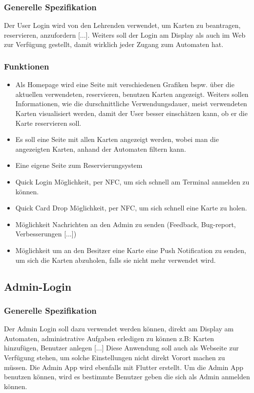 \documentclass[a4paper]{article}
\begin{document}
\subsubsection{Generelle Spezifikation}
Der User Login wird von den Lehrenden verwendet, um Karten zu beantragen, reservieren, anzufordern [...]. Weiters soll der Login am Display als auch im Web zur Verfügung gestellt, damit wirklich jeder Zugang zum Automaten hat. 

\subsubsection{Funktionen}
\begin{itemize}
  \item Als Homepage wird eine Seite mit verschiedenen Grafiken  bspw. über die aktuellen verwendeten, reservieren, benutzen Karten angezeigt. Weiters sollen Informationen, wie die durschnittliche Verwendungsdauer, meist verwendeten Karten visualisiert werden, damit der User besser einschätzen kann, ob er die Karte reservieren soll.
  \item Es soll eine Seite mit allen Karten angezeigt werden, wobei man die angezeigten Karten, anhand der Automaten filtern kann.
  \item Eine eigene Seite zum Reservierungsystem
  \item Quick Login Möglichkeit, per NFC, um sich schnell am Terminal anmelden zu können. 
  \item Quick Card Drop Möglichkeit, per NFC, um sich schnell eine Karte zu holen.
  \item Möglichkeit Nachrichten an den Admin zu senden (Feedback, Bug-report, Verbesserungen [...])
  \item Möglichkeit um an den Besitzer eine Karte eine Push Notification zu senden, um sich die Karten abzuholen, falls sie nicht mehr verwendet wird.
\end{itemize}

\subsection{Admin-Login}
\subsubsection{Generelle Spezifikation}
Der Admin Login soll dazu verwendet werden können, direkt am Display am Automaten, administrative Aufgaben erledigen zu können z.B: Karten hinzufügen, Benutzer anlegen [...] Diese Anwendung soll auch als Webseite zur Verfügung stehen, um solche Einstellungen nicht direkt Vorort machen zu müssen. Die Admin App wird ebenfalls mit Flutter erstellt. Um die Admin App benutzen können, wird es bestimmte Benutzer geben die sich als Admin anmelden können. 
\end{document}
